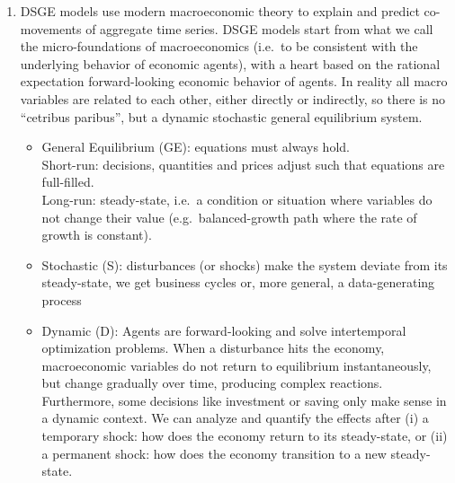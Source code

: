 \begin{enumerate}
\item DSGE models use modern macroeconomic theory to explain and predict co-movements of aggregate time series.
DSGE models start from what we call the micro-foundations of macroeconomics (i.e.\ to be consistent with the underlying behavior of economic agents),
with a heart based on the rational expectation forward-looking economic behavior of agents.
In reality all macro variables are related to each other, either directly or indirectly,
  so there is no \enquote{cetribus paribus}, but a dynamic stochastic general equilibrium system.
\begin{itemize}
\item General Equilibrium (GE): equations must always hold.
\\
Short-run: decisions, quantities and prices adjust such that equations are full-filled.
\\
Long-run: steady-state, i.e.\ a condition or situation where variables do not change their value (e.g.\ balanced-growth path where the rate of growth is constant).
\item Stochastic (S): disturbances (or shocks) make the system deviate from its steady-state, we get business cycles or, more general, a data-generating process
\item Dynamic (D): Agents are forward-looking and solve intertemporal optimization problems.
When a disturbance hits the economy, macroeconomic variables do not return to equilibrium instantaneously,
  but change gradually over time, producing complex reactions.
Furthermore, some decisions like investment or saving only make sense in a dynamic context.
We can analyze and quantify the effects after
  (i) a temporary shock: how does the economy return to its steady-state, or
  (ii) a permanent shock: how does the economy transition to a new steady-state.
\end{itemize}


\end{enumerate}
